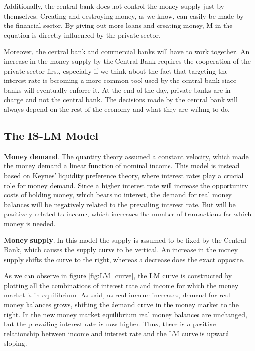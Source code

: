 \documentclass[11pt,a4paper,oneside]{book}
\begin{document}
Additionally, the central bank does not control the money supply just by themselves. Creating and destroying money, as we know, can easily be made by the financial sector. By giving out more loans and creating money, M in the equation is directly influenced by the private sector.

Moreover, the central bank and commercial banks will have to work together. An increase in the money supply by the Central Bank requires the cooperation of the private sector first, especially if we think about the fact that targeting the interest rate is becoming a more common tool used by the central bank since banks will eventually enforce it. At the end of the day, private banks are in charge and not the central bank. The decisions made by the central bank will always depend on the rest of the economy and what they are willing to do.

\subsection{The IS-LM Model}
\label{sec:IS_LM}

\textbf{Money demand}. The quantity theory assumed a constant velocity, which made the money demand a linear function of nominal income. This model is instead based on Keynes' liquidity preference theory, where interest rates play a crucial role for money demand. Since a higher interest rate will increase the opportunity costs of holding money, which bears no interest, the demand for real money balances will be negatively related to the prevailing interest rate. But will be positively related to income, which increases the number of transactions for which money is needed.

\textbf{Money supply}. In this model the supply is assumed to be fixed by the Central Bank, which causes the supply curve to be vertical. An increase in the money supply shifts the curve to the right, whereas a decrease does the exact opposite.

As we can observe in figure \ref{fig:LM_curve}, the LM curve is constructed by plotting all the combinations of interest rate and income for which the money market is in equilibrium. As said, as real income increases, demand for real money balances grows, shifting the demand curve in the money market to the right. In the new money market equilibrium real money balances are unchanged, but the prevailing interest rate is now higher. Thus, there is a positive relationship between income and interest rate and the LM curve is upward sloping.
\end{document}
